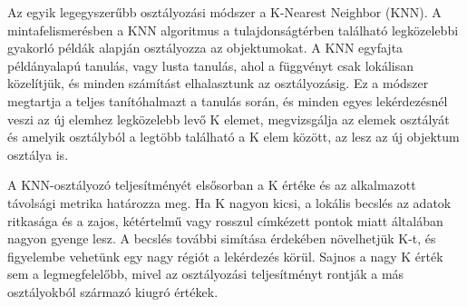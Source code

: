 Az egyik legegyszerűbb osztályozási módszer a K-Nearest Neighbor (KNN). A mintafelismerésben a KNN algoritmus a tulajdonságtérben található legközelebbi gyakorló példák alapján osztályozza az objektumokat. A KNN egyfajta példányalapú tanulás, vagy lusta tanulás, ahol a függvényt csak lokálisan közelítjük, és minden számítást elhalasztunk az osztályozásig. Ez a módszer megtartja a teljes tanítóhalmazt a tanulás során, és minden egyes lekérdezésnél veszi az új elemhez legközelebb levő K elemet, megvizsgálja az elemek osztályát és amelyik osztályból a legtöbb található a K elem között, az lesz az új objektum osztálya is.

A KNN-osztályozó teljesítményét elsősorban a K értéke és az alkalmazott távolsági metrika határozza meg. Ha K nagyon kicsi, a lokális becslés az adatok ritkasága és a zajos, kétértelmű vagy rosszul címkézett pontok miatt általában nagyon gyenge lesz. A becslés további simítása érdekében növelhetjük K-t, és figyelembe vehetünk egy nagy régiót a lekérdezés körül. Sajnos a nagy K érték sem a legmegfelelőbb, mivel az osztályozási teljesítményt rontják a más osztályokból származó kiugró értékek. \cite{knn}

